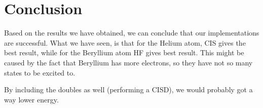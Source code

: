 \section{Conclusion} \label{sec:conclusion}
Based on the results we have obtained, we can conclude that our implementations are successful. What we have seen, is that for the Helium atom, CIS gives the best result, while for the Beryllium atom HF gives best result. This might be caused by the fact that Beryllium has more electrons, so they have not so many states to be excited to. 

By including the doubles as well (performing a CISD), we would probably got a way lower energy. 